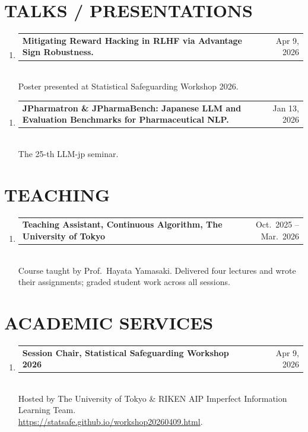 \documentclass[11pt,a4paper]{article}
\makeatletter
\newcommand{\entry}[2]{%
  \noindent\begin{tabularx}{\linewidth}{@{}Xr@{}}#1 & #2\end{tabularx}%
}
\makeatother
\begin{document}
\section{TALKS / PRESENTATIONS}

\begin{enumerate}[leftmargin=2em, start=2]
	\item \entry{\textbf{Mitigating Reward Hacking in RLHF via Advantage Sign Robustness.}}{Apr 9, 2026}\\
	      Poster presented at Statistical Safeguarding Workshop 2026.
\end{enumerate}
\vspace{-\topsep}
\begin{enumerate}[leftmargin=2em]
	\item \entry{\textbf{JPharmatron \& JPharmaBench: Japanese LLM and Evaluation Benchmarks for Pharmaceutical NLP.}}{Jan 13, 2026}\\
	      The 25-th LLM-jp seminar.
\end{enumerate}

\section{TEACHING}

\begin{enumerate}[leftmargin=2em]
	\item \entry{\textbf{Teaching Assistant, Continuous Algorithm, The University of Tokyo}}{Oct.\ 2025 -- Mar.\ 2026}\\
	      Course taught by Prof.\ Hayata Yamasaki. Delivered four lectures and wrote their assignments;
	      graded student work across all sessions.
\end{enumerate}

\section{ACADEMIC SERVICES}

\begin{enumerate}[leftmargin=2em]
	\item \entry{\textbf{Session Chair, Statistical Safeguarding Workshop 2026}}{Apr 9, 2026}\\
	      Hosted by The University of Tokyo \& RIKEN AIP Imperfect Information Learning Team.\\
	      \href{https://statsafe.github.io/workshop20260409.html}{https://statsafe.github.io/workshop20260409.html}.
\end{enumerate}
\end{document}
